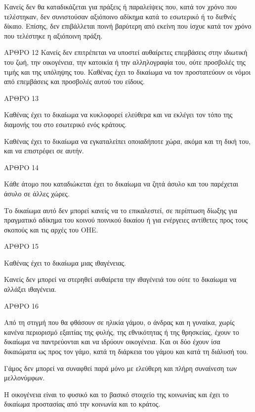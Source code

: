 \documentclass{report}
\begin{document}
            Κανείς δεν θα καταδικάζεται για πράξεις ή παραλείψεις που, κατά τον χρόνο που τελέστηκαν, δεν συνιστούσαν αξιόποινο αδίκημα κατά το εσωτερικό ή το διεθνές δίκαιο. Επίσης, δεν επιβάλλεται ποινή βαρύτερη από εκείνη που ίσχυε κατά τον χρόνο που τελέστηκε η αξιόποινη πράξη.



      ΑΡΘΡΟ 12
      Κανείς δεν επιτρέπεται να υποστεί αυθαίρετες επεμβάσεις στην ιδιωτική του ζωή, την οικογένεια, την κατοικία ή την αλληλογραφία του, ούτε προσβολές της τιμής και της υπόληψης του. Καθένας έχει το δικαίωμα να τον προστατεύουν οι νόμοι από επεμβάσεις και προσβολές αυτού του είδους.

      ΑΡΘΡΟ 13


            Καθένας έχει το δικαίωμα να κυκλοφορεί ελεύθερα και να εκλέγει τον τόπο της διαμονής του στο εσωτερικό ενός κράτους.


            Καθένας έχει το δικαίωμα να εγκαταλείπει οποιαδήποτε χώρα, ακόμα και τη δική του, και να επιστρέφει σε αυτήν.



      ΑΡΘΡΟ 14


            Κάθε άτομο που καταδιώκεται έχει το δικαίωμα να ζητά άσυλο και του παρέχεται άσυλο σε άλλες χώρες.


            Το δικαίωμα αυτό δεν μπορεί κανείς να το επικαλεστεί, σε περίπτωση δίωξης για πραγματικό αδίκημα του κοινού ποινικού δικαίου ή για ενέργειες αντίθετες προς τους σκοπούς και τις αρχές του ΟΗΕ.



      ΑΡΘΡΟ 15


            Καθένας έχει το δικαίωμα μιας ιθαγένειας.


            Κανείς δεν μπορεί να στερηθεί αυθαίρετα την ιθαγένειά του ούτε το δικαίωμα να αλλάξει ιθαγένεια.



      ΑΡΘΡΟ 16


            Από τη στιγμή που θα φθάσουν σε ηλικία γάμου, ο άνδρας και η γυναίκα, χωρίς κανένα περιορισμό εξαιτίας της φυλής, της εθνικότητας ή της θρησκείας, έχουν το δικαίωμα να παντρεύονται και να ιδρύουν οικογένεια. Και οι δύο έχουν ίσα δικαιώματα ως προς τον γάμο, κατά τη διάρκεια του γάμου και κατά τη διάλυσή του.


            Γάμος δεν μπορεί να συναφθεί παρά μόνο με ελεύθερη και πλήρη συναίνεση των μελλονύμφων.


            Η οικογένεια είναι το φυσικό και το βασικό στοιχείο της κοινωνίας και έχει το δικαίωμα προστασίας από την κοινωνία και το κράτος.
\end{document}
